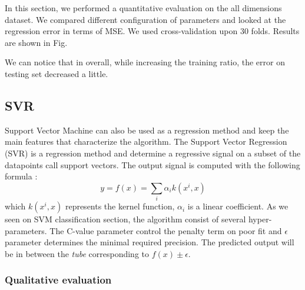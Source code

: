 In this section, we performed a quantitative evaluation on the all dimensions dataset. We compared different configuration of parameters and looked at the regression error in terms of MSE. We used cross-validation upon 30 folds. Results are shown in Fig.


We can notice that in overall, while increasing the training ratio, the error on testing set decreased a little.




\subsection{SVR}
Support Vector Machine can also be used as a regression method and keep the main features that characterize the algorithm. The Support Vector Regression (SVR) is a regression method and determine a regressive signal on a subset of the datapoints call support vectors. The output signal is computed with the following formula :
\begin{equation}
y = f(x) = \sum_i \alpha_i k (x^{i},x)
\end{equation}
which $k(x^{i},x)$ represents the kernel function, $\alpha_i$ is a linear coefficient. As we seen on SVM classification section, the algorithm consist of several hyper-parameters. The C-value parameter control the penalty term on poor fit and $\epsilon$ parameter determines the minimal required precision. The predicted output will be in between the \emph{tube} corresponding to $f(x)\pm\epsilon$. 

\subsubsection{Qualitative evaluation}

